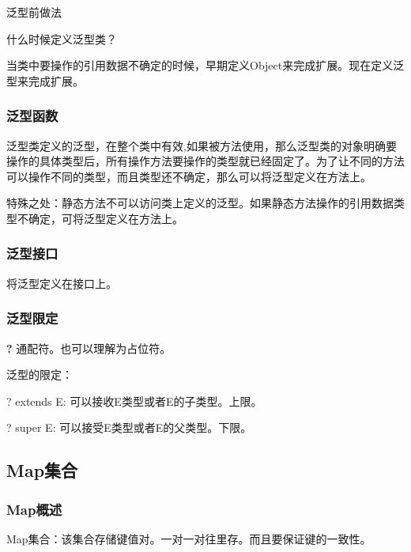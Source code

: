 \documentclass[UTF8]{ctexart}
\begin{document}
泛型前做法

什么时候定义泛型类？

当类中要操作的引用数据不确定的时候，早期定义Object来完成扩展。现在定义泛型来完成扩展。



\subsubsection{泛型函数}

\textbullet 泛型类定义的泛型，在整个类中有效,如果被方法使用，那么泛型类的对象明确要操作的具体类型后，所有操作方法要操作的类型就已经固定了。为了让不同的方法可以操作不同的类型，而且类型还不确定，那么可以将泛型定义在方法上。

\textbullet 特殊之处：静态方法不可以访问类上定义的泛型。如果静态方法操作的引用数据类型不确定，可将泛型定义在方法上。


\subsubsection{泛型接口}

将泛型定义在接口上。

\subsubsection{泛型限定}

\textbullet \textbf{?} 通配符。也可以理解为占位符。

泛型的限定：

\textbullet ? extends E: 可以接收E类型或者E的子类型。上限。

\textbullet ? super E: 可以接受E类型或者E的父类型。下限。




\subsection{Map集合}
\subsubsection{Map概述}

Map集合：该集合存储键值对。一对一对往里存。而且要保证键的一致性。
\end{document}
